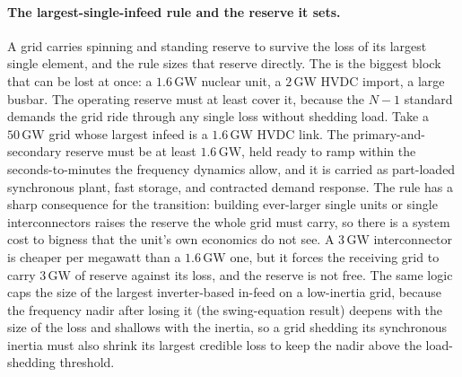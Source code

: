 \paragraph{The largest-single-infeed rule and the reserve it sets.} A grid
carries spinning and standing reserve to survive the loss of its largest
single element, and the rule sizes that reserve directly. The
 is the biggest block that can be lost at once:
a $1.6\,\si{\giga\watt}$ nuclear unit, a $2\,\si{\giga\watt}$ HVDC import, a
large busbar. The operating reserve must at least cover it, because the $N-1$
standard demands the grid ride through any single loss without shedding load.
Take a $50\,\si{\giga\watt}$ grid whose largest infeed is a $1.6\,\si{\giga
\watt}$ HVDC link. The primary-and-secondary reserve must be at least
$1.6\,\si{\giga\watt}$, held ready to ramp within the seconds-to-minutes the
frequency dynamics allow, and it is carried as part-loaded synchronous plant,
fast storage, and contracted demand response. The rule has a sharp
consequence for the transition: building ever-larger single units or single
interconnectors raises the reserve the whole grid must carry, so there is a
system cost to bigness that the unit's own economics do not see. A $3\,\si{
\giga\watt}$ interconnector is cheaper per megawatt than a $1.6\,\si{\giga
\watt}$ one, but it forces the receiving grid to carry $3\,\si{\giga\watt}$ of
reserve against its loss, and the reserve is not free. The same logic caps the
size of the largest inverter-based in-feed on a low-inertia grid, because the
frequency nadir after losing it (the swing-equation result) deepens with the
size of the loss and shallows with the inertia, so a grid shedding its
synchronous inertia must also shrink its largest credible loss to keep the
nadir above the load-shedding threshold.

